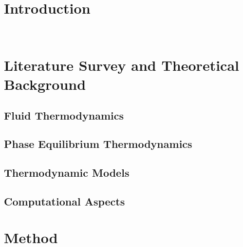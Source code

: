 \documentclass[a4paperm,bezier,amstex]{report}
\numberwithin{equation}{section}
\numberwithin{figure}{section}
\begin{document}
\pagestyle{empty}

\tableofcontents
\pagebreak	
\cleardoublepage 
\pagestyle{plain}
\setcounter{page}{\value{PageDummy}}

	\printnomenclature%
	\pagebreak	
	\chapter*{Introduction}\
	

	\chapter{Literature Survey and Theoretical Background}
		\section{Fluid Thermodynamics}
		
		
	
		\section{Phase Equilibrium Thermodynamics}
		
	
 		\section{Thermodynamic Models}
 		
	
		\section{Computational Aspects}
		
		

		
	\chapter{Method}
		
		
\end{document}
